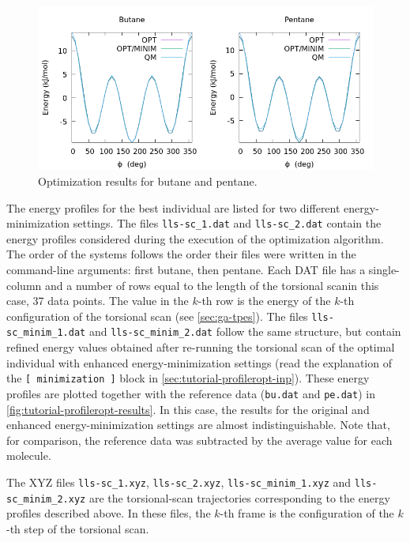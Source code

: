 \documentclass[10pt,a4paper,openany]{memoir}
\numberwithin{equation}{section}
\begin{document}
\begin{figure}[tb]
  \centering
  \includegraphics[width=.8\textwidth]{opt-results}
  \caption{Optimization results for butane and pentane.}
  \label{fig:tutorial-profileropt-results}
\end{figure}

The energy profiles for the best individual are listed for two
different energy-minimization settings. The files
\texttt{lls-sc\_1.dat} and \texttt{lls-sc\_2.dat} contain the energy
profiles considered during the execution of the optimization
algorithm.  The order of the systems follows the order their files
were written in the command-line arguments: first butane, then
pentane. Each DAT file has a single-column and a number of rows equal
to the length of the torsional scan\textemdash{}in this case, 37 data
points. The value in the $k$-th row is the energy of the $k$-th
configuration of the torsional scan (see \autoref{sec:ga-tpes}).  The
files \texttt{lls-sc\_minim\_1.dat} and \texttt{lls-sc\_minim\_2.dat}
follow the same structure, but contain refined energy values obtained
after re-running the torsional scan of the optimal individual with
enhanced energy-minimization settings (read the explanation of the
\texttt{[~minimization~]} block in
\autoref{sec:tutorial-profileropt-inp}). These energy profiles are
plotted together with the reference data (\texttt{bu.dat} and
\texttt{pe.dat}) in \autoref{fig:tutorial-profileropt-results}.  In
this case, the results for the original and enhanced
energy-minimization settings are almost indistinguishable.  Note that,
for comparison, the reference data was subtracted by the average value
for each molecule.

The XYZ files \texttt{lls-sc\_1.xyz}, \texttt{lls-sc\_2.xyz},
\texttt{lls-sc\_minim\_1.xyz} and \texttt{lls-sc\_minim\_2.xyz} are
the torsional-scan trajectories corresponding to the energy profiles
described above. In these files, the $k$-th frame is the configuration
of the $k$-th step of the torsional scan.
\end{document}
